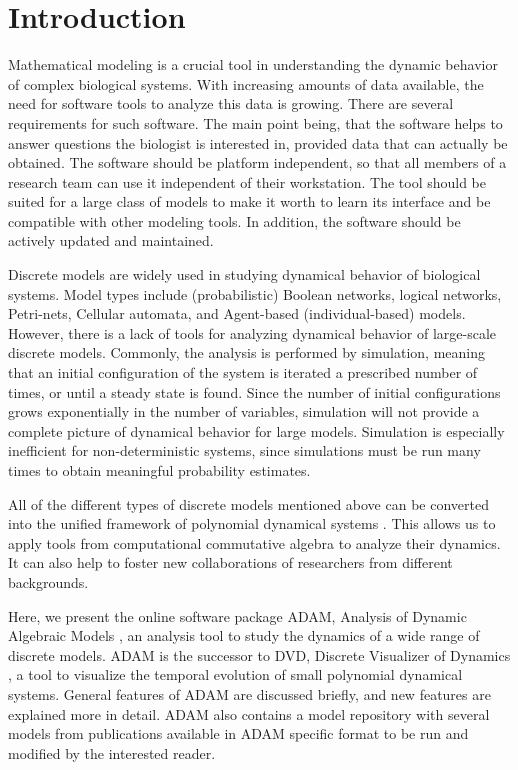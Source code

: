 \documentclass[11pt]{amsart}
\begin{document}
 
\section{Introduction}
 
Mathematical modeling is a crucial tool in understanding the dynamic behavior of complex
biological systems. With increasing amounts of data available, the need for software tools to analyze this data is growing. There are several requirements for such software. The main point being, that the software helps to answer questions the biologist is interested in, provided data that can actually be obtained. The software should be platform independent, so that all members of a research team can use it independent of their workstation. The tool should be suited for a large class of models to make it worth to learn its interface and be compatible with other modeling tools. In addition, the software should be actively updated and maintained.
 
Discrete models are widely used in studying dynamical behavior of biological systems. Model types include
(probabilistic) Boolean networks, logical networks, Petri-nets, Cellular
automata, and Agent-based (individual-based) models.
However, there is a lack of tools
for analyzing dynamical behavior of large-scale discrete models. Commonly, the analysis is performed by simulation, meaning that an
initial configuration of the system is iterated a prescribed number of times, or until a
steady state is found. Since the number of initial configurations grows exponentially in the number of variables, simulation
will not provide a complete picture of dynamical behavior for large models.
Simulation is especially inefficient for non-deterministic
systems, since simulations must be run many times to obtain meaningful
probability estimates.
 
All of the different types of discrete models mentioned above can be
converted into the unified framework of polynomial dynamical systems
\cite{Alan:Bioinf2010, Hinkelmann:2010}. This allows us to apply tools from
computational commutative algebra to analyze their dynamics. It can also help to foster new collaborations of researchers from different backgrounds.
 
Here, we present the online software package ADAM, Analysis of Dynamic Algebraic Models \cite{ADAM}, an analysis tool to study the dynamics of a wide range of discrete models. ADAM is the successor to DVD, Discrete Visualizer of Dynamics \cite{DVD}, a tool to visualize the temporal evolution of small polynomial dynamical systems.
General features of ADAM are discussed briefly, and new features are explained more in detail. ADAM also contains a model repository with several models from publications available in ADAM specific format to be run and modified by the interested reader.
 
\end{document}
